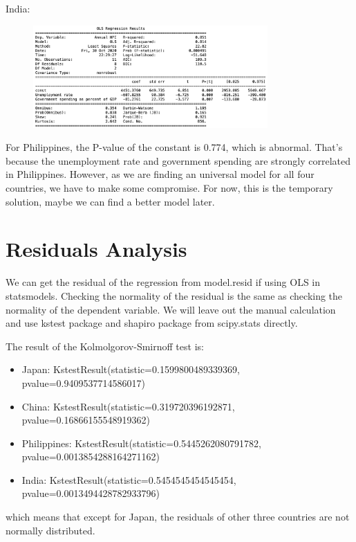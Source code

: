 \documentclass[11pt]{article}
\begin{document}
India:
\begin{figure}[H]
\begin{center}
    \includegraphics[width=0.8\textwidth]{./image/Reg_IND.png}
\end{center}
\end{figure}

For Philippines, the P-value of the constant is 0.774, which is abnormal. That's because the unemployment rate and government spending are strongly correlated in Philippines. However, as we are finding an universal model for all four countries, we have to make some compromise. For now, this is the temporary solution, maybe we can find a better model later.

\section{Residuals Analysis}\label{residuals_analysis}
We can get the residual of the regression from model.resid if using OLS in statsmodels. Checking the normality of the residual is the same as checking the normality of the dependent variable. We will leave out the manual calculation and use kstest package and shapiro package from scipy.stats directly.

The result of the Kolmolgorov-Smirnoff test is:
\begin{itemize}
    \item Japan: KstestResult(statistic=0.1599800489339369, pvalue=0.9409537714586017)
    \item China: KstestResult(statistic=0.319720396192871, pvalue=0.16866155548919362)
    \item Philippines: KstestResult(statistic=0.5445262080791782, pvalue=0.0013854288164271162)
    \item India: KstestResult(statistic=0.5454545454545454, pvalue=0.0013494428782933796)
\end{itemize}

which means that except for Japan, the residuals of other three countries are not normally distributed.
\end{document}
